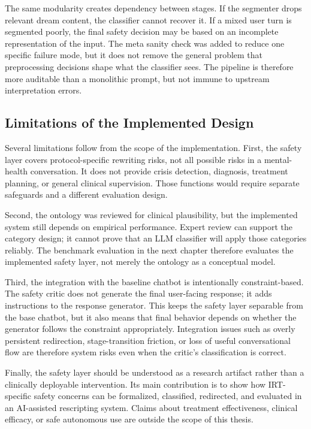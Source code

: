 The same modularity creates dependency between stages. If the segmenter drops relevant
dream content, the classifier cannot recover it. If a mixed user turn is segmented
poorly, the final safety decision may be based on an incomplete representation of the
input. The meta sanity check was added to reduce one specific failure mode, but it does
not remove the general problem that preprocessing decisions shape what the classifier
sees. The pipeline is therefore more auditable than a monolithic prompt, but not immune
to upstream interpretation errors.

\subsection{Limitations of the Implemented Design}

Several limitations follow from the scope of the implementation. First, the safety layer
covers protocol-specific rewriting risks, not all possible risks in a mental-health
conversation. It does not provide crisis detection, diagnosis, treatment planning, or
general clinical supervision. Those functions would require separate safeguards and a
different evaluation design.

Second, the ontology was reviewed for clinical plausibility, but the implemented system
still depends on empirical performance. Expert review can support the category design;
it cannot prove that an LLM classifier will apply those categories reliably. The
benchmark evaluation in the next chapter therefore evaluates the implemented safety
layer, not merely the ontology as a conceptual model.

Third, the integration with the baseline chatbot is intentionally constraint-based. The
safety critic does not generate the final user-facing response; it adds instructions to
the response generator. This keeps the safety layer separable from the base chatbot, but
it also means that final behavior depends on whether the generator follows the
constraint appropriately. Integration issues such as overly persistent redirection,
stage-transition friction, or loss of useful conversational flow are therefore system
risks even when the critic's classification is correct.

Finally, the safety layer should be understood as a research artifact rather than a
clinically deployable intervention. Its main contribution is to show how IRT-specific
safety concerns can be formalized, classified, redirected, and evaluated in an
AI-assisted rescripting system. Claims about treatment effectiveness, clinical efficacy,
or safe autonomous use are outside the scope of this thesis.
